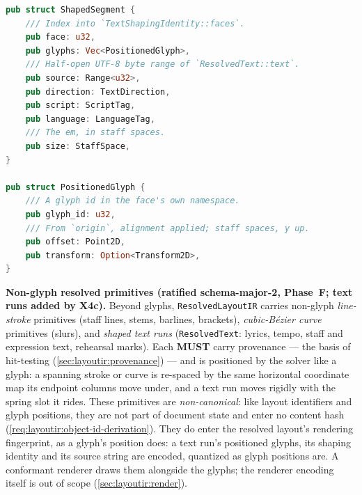 \documentclass[11pt,letterpaper]{report}
\newcounter{requirement}[chapter]
\newcommand{\MUST}{\textbf{MUST}}
\begin{document}
\begin{lstlisting}[language=Rust]
pub struct ShapedSegment {
    /// Index into `TextShapingIdentity::faces`.
    pub face: u32,
    pub glyphs: Vec<PositionedGlyph>,
    /// Half-open UTF-8 byte range of `ResolvedText::text`.
    pub source: Range<u32>,
    pub direction: TextDirection,
    pub script: ScriptTag,
    pub language: LanguageTag,
    /// The em, in staff spaces.
    pub size: StaffSpace,
}

pub struct PositionedGlyph {
    /// A glyph id in the face's own namespace.
    pub glyph_id: u32,
    /// From `origin`, alignment applied; staff spaces, y up.
    pub offset: Point2D,
    pub transform: Option<Transform2D>,
}
\end{lstlisting}

\begin{requirement}
  \label{req:layoutir:resolved-primitives}
  \textbf{Non-glyph resolved primitives (ratified schema-major-2,
  Phase~F; text runs added by X4c).} Beyond glyphs,
  \texttt{ResolvedLayoutIR} carries non-glyph \emph{line-stroke}
  primitives (staff lines, stems, barlines, brackets),
  \emph{cubic-B\'ezier curve} primitives (slurs), and \emph{shaped text
  runs} (\texttt{ResolvedText}: lyrics, tempo, staff and expression
  text, rehearsal marks). Each \MUST{} carry provenance --- the basis of
  hit-testing (\ref{sec:layoutir:provenance}) --- and is positioned by
  the solver like a glyph: a spanning stroke or curve is re-spaced by the
  same horizontal coordinate map its endpoint columns move under, and a
  text run moves rigidly with the spring slot it rides. These
  primitives are \emph{non-canonical}: like layout identifiers and glyph
  positions, they are not part of document state and enter no content
  hash (\ref{req:layoutir:object-id-derivation}). They do enter the
  resolved layout's rendering fingerprint, as a glyph's position does:
  a text run's positioned glyphs, its shaping identity and its source
  string are encoded, quantized as glyph positions are. A conformant
  renderer draws them alongside the glyphs; the renderer encoding itself
  is out of scope (\ref{sec:layoutir:render}).
\end{requirement}
\end{document}
